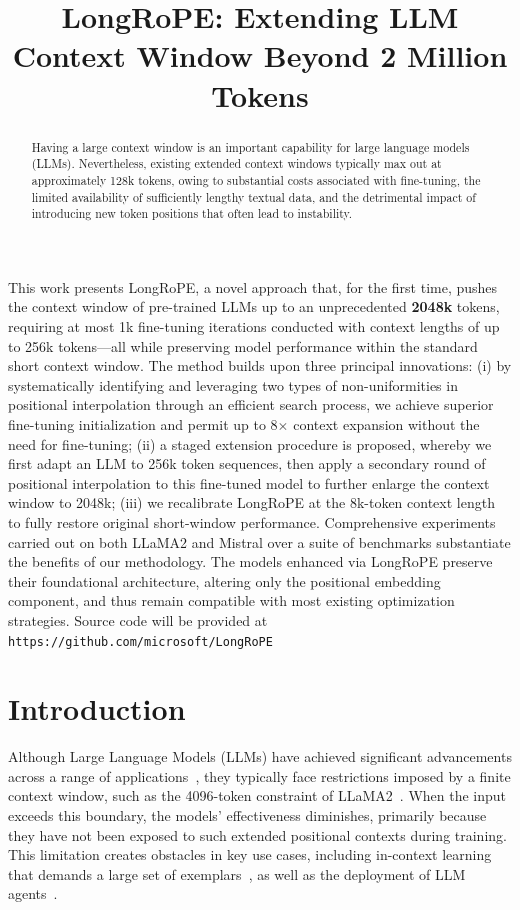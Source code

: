 \title{LongRoPE: Extending LLM Context Window Beyond 2 Million Tokens}

\begin{abstract}
Having a large context window is an important capability for large language models (LLMs). Nevertheless, existing extended context windows typically max out at approximately 128k tokens, owing to substantial costs associated with fine-tuning, the limited availability of sufficiently lengthy textual data, and the detrimental impact of introducing new token positions that often lead to instability.
\end{abstract}

This work presents LongRoPE, a novel approach that, for the first time, pushes the context window of pre-trained LLMs up to an unprecedented \textbf{2048k} tokens, requiring at most 1k fine-tuning iterations conducted with context lengths of up to 256k tokens—all while preserving model performance within the standard short context window. The method builds upon three principal innovations: (i) by systematically identifying and leveraging two types of non-uniformities in positional interpolation through an efficient search process, we achieve superior fine-tuning initialization and permit up to 8$\times$ context expansion without the need for fine-tuning; (ii) a staged extension procedure is proposed, whereby we first adapt an LLM to 256k token sequences, then apply a secondary round of positional interpolation to this fine-tuned model to further enlarge the context window to 2048k; (iii) we recalibrate LongRoPE at the 8k-token context length to fully restore original short-window performance. Comprehensive experiments carried out on both LLaMA2 and Mistral over a suite of benchmarks substantiate the benefits of our methodology. The models enhanced via LongRoPE preserve their foundational architecture, altering only the positional embedding component, and thus remain compatible with most existing optimization strategies. Source code will be provided at \texttt{https://github.com/microsoft/LongRoPE}

\section{Introduction}

Although Large Language Models (LLMs) have achieved significant advancements across a range of applications~\cite{gpt4,llama2}, they typically face restrictions imposed by a finite context window, such as the 4096-token constraint of LLaMA2~\cite{llama2}. When the input exceeds this boundary, the models' effectiveness diminishes, primarily because they have not been exposed to such extended positional contexts during training. This limitation creates obstacles in key use cases, including in-context learning that demands a large set of exemplars~\cite{Huang2023FewerIM}, as well as the deployment of LLM agents~\cite{park2023generative,madaan2023selfrefine}.

